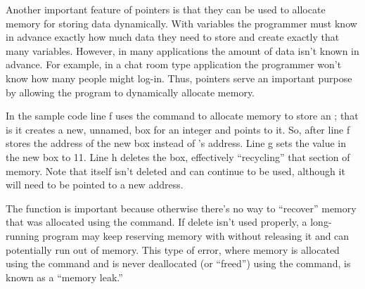Another important feature of pointers is that they can be used to allocate memory for storing data dynamically.  With variables the programmer must know in advance exactly how much data they need to store and create exactly that many variables.  However, in many applications the amount of data isn't known in advance.  For example, in a chat room type application the programmer won't know how many people might log-in.  Thus, pointers serve an important purpose by allowing the program to dynamically allocate memory.  

In the sample code line f uses the  command to allocate memory to store an ; that is it creates a new, unnamed, box for an integer and points  to it.  So, after line f  stores the address of the new box instead of 's address.  Line g sets the value in the new box to 11.  Line h deletes the box, effectively ``recycling'' that section of memory.  Note that  itself isn't deleted and can continue to be used, although it will need to be pointed to a new address.

The  function is important because otherwise there's no way to ``recover'' memory that was allocated using the  command.  If delete isn't used properly, a long-running program may keep reserving memory with  without releasing it and can potentially run out of memory.  This type of error, where memory is allocated using the  command and is never deallocated (or ``freed'') using the  command, is known as a ``memory leak.''

